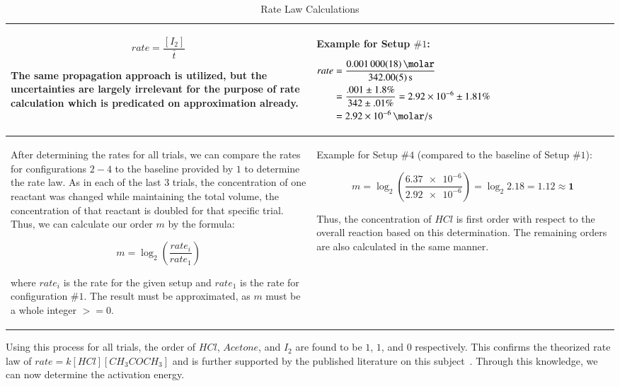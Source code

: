 \begin{table}[H]
\begin{tabularx}{\textwidth}{|X|X|}
\[rate = \frac{[I_2]}{\bar{t}}\]

The same propagation approach is utilized, but the uncertainties are largely irrelevant for the purpose of rate calculation which is predicated on approximation already.
&
Example for Setup $\# 1$: \newline

	{$\!\begin{aligned}
	rate &= \frac{\SI{.001 \pm .000018}{\molar}}{\SI{342 \pm .05}{\second}} \\
	&= \frac{.001 \pm 1.8\%}{342 \pm .01\%} = \num{2.92e-6} \pm 1.81\% \\
	&= \SI{2.92e-6}{\molar\per\second}
	\end{aligned}$} \\

  \hline
After determining the rates for all trials, we can compare the rates for configurations $2-4$ to the baseline provided by $1$ to determine the rate law. As in each of the last $3$ trials, the concentration of one reactant was changed while maintaining the total volume, the concentration of that reactant is doubled for that specific trial. Thus, we can calculate our order $m$ by the formula:

\[m = \log_2 \left(\frac{rate_i}{rate_1}\right)\]

where $rate_i$ is the rate for the given setup and $rate_1$ is the rate for configuration $\#1$. The result must be approximated, as $m$ must be a whole integer $>=0$.
&
Example for Setup $\# 4$ (compared to the baseline of Setup $\# 1$):

	\[m = \log_2 \left(\frac{\num{6.37e-6}}{\num{2.92e-6}}\right) = \log_2 2.18 = 1.12 \approx \bm{1}\]

Thus, the concentration of $HCl$ is first order with respect to the overall reaction based on this determination. The remaining orders are also calculated in the same manner. \\

\hline

\end{tabularx}
\caption{Rate Law Calculations}
\label{table:rate_law_calculations}
\end{table}

Using this process for all trials, the order of $HCl$, $Acetone$, and $I_2$ are found to be $1$, $1$, and $0$ respectively. This confirms the theorized rate law of $rate = k[HCl][CH_3COCH_3]$ and is further supported by the published literature on this subject~\parencite{main_literature}. Through this knowledge, we can now determine the activation energy.
\newpage
